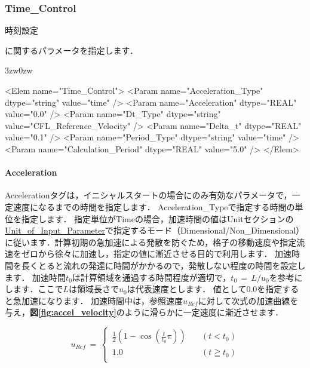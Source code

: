 \pagebreak
\subsubsection{Time\_Control}

\hypertarget{tgt:time_control}{時刻設定}に関するパラメータを指定します．

\begin{indentation}{3zw}{0zw}

{\small
\begin{program}
<Elem name="Time_Control">
  <Param name="Acceleration_Type"  dtype="string" value="time" />
  <Param name="Acceleration"       dtype="REAL"   value="0.0" />
  <Param name="Dt_Type"            dtype="string" value="CFL_Reference_Velocity" />
  <Param name="Delta_t"            dtype="REAL"   value="0.1" />
  <Param name="Period_Type"        dtype="string" value="time" />
  <Param name="Calculation_Period" dtype="REAL"   value="5.0" />
</Elem>
\end{program}
}

%
\paragraph{Acceleration}
Accelerationタグは，イニシャルスタートの場合にのみ有効なパラメータで，一定速度になるまでの時間を指定します．
Acceleration\_Typeで指定する時間の単位を指定します．
指定単位がTimeの場合，加速時間の値はUnitセクションの\hyperlink{tgt:unit}{Unit\_of\_Input\_Parameter}で指定するモード（Dimensional/Non\_Dimensional）に従います．計算初期の急加速による発散を防ぐため，格子の移動速度や指定流速をゼロから徐々に加速し，指定の値に漸近させる目的で利用します．
加速時間を長くとると流れの発達に時間がかかるので，発散しない程度の時間を設定します．
加速時間$t_0$は計算領域を通過する時間程度が適切で，$t_0\,=\,L/u_0$を参考にします．ここで$L$は領域長さで$u_0$は代表速度とします．
値として0.0を指定すると急加速になります．
加速時間中は，参照速度$u_{Ref}$に対して次式の加速曲線を与え，\textbf{図\ref{fig:accel_velocity}}のように滑らかに一定速度に漸近させます．

\begin{equation}
u_{Ref}\,=\,
\begin{cases}
\, \displaystyle {\frac{1}{2}}\left(1-\cos \left( \frac{t}{t_{0}}\pi \right) \right) & \quad (t < t_{0})\\
\, 1.0 & \quad (t \geqq t_{0})\\
\end{cases}
\label{eq:Ref_velocity_eq}
\end{equation}


\end{indentation}
